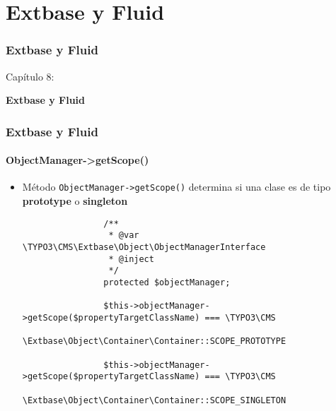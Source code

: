 %

\section{Extbase y Fluid}
\begin{frame}[fragile]
	\frametitle{Extbase y Fluid}

	\begin{center}\huge{Capítulo 8:}\end{center}
	\begin{center}\huge{\color{typo3darkgrey}\textbf{Extbase y Fluid}}\end{center}

\end{frame}


\begin{frame}[fragile]
	\frametitle{Extbase y Fluid}
	\framesubtitle{ObjectManager->getScope()}

	\lstset{
		basicstyle=\tiny\ttfamily
	}

	\begin{itemize}
		\item Método \texttt{ObjectManager->getScope()} determina\newline
			si una clase es de tipo \textbf{prototype} o \textbf{singleton}

			\begin{lstlisting}
				/**
				 * @var \TYPO3\CMS\Extbase\Object\ObjectManagerInterface
				 * @inject
				 */
				protected $objectManager;

				$this->objectManager->getScope($propertyTargetClassName) === \TYPO3\CMS
				\Extbase\Object\Container\Container::SCOPE_PROTOTYPE

				$this->objectManager->getScope($propertyTargetClassName) === \TYPO3\CMS
				\Extbase\Object\Container\Container::SCOPE_SINGLETON
			\end{lstlisting}

	\end{itemize}

\end{frame}

